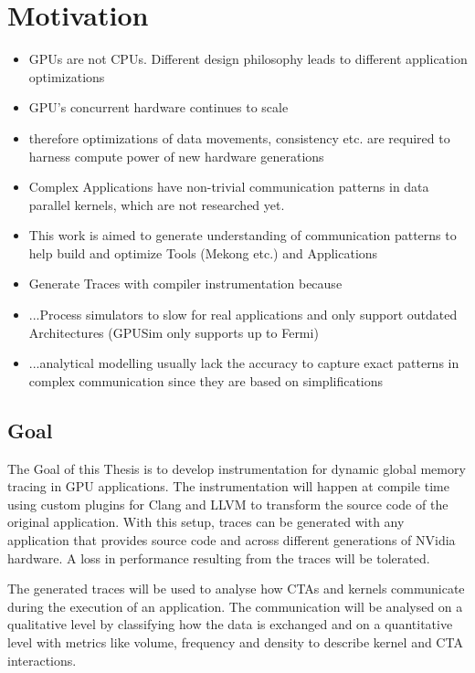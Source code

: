 \chapter{Motivation}
\begin{itemize}
	\item GPUs are not CPUs. Different design philosophy leads to different application optimizations
	\item GPU's concurrent hardware continues to scale
	\item therefore optimizations of data movements, consistency etc. are required to harness compute power of new hardware generations
	\item Complex Applications have non-trivial communication patterns in data parallel kernels, which are not researched yet.
	\item This work is aimed to generate understanding of communication patterns to help build and optimize Tools (Mekong etc.) and Applications
	\item Generate Traces with compiler instrumentation because
	\item ...Process simulators to slow for real applications and only support outdated Architectures (GPUSim only supports up to Fermi)
	\item ...analytical modelling usually lack the accuracy to capture exact patterns in complex communication since they are based on simplifications
	
\end{itemize}
\section{Goal}
The Goal of this Thesis is to develop instrumentation for dynamic global memory tracing in GPU applications. The instrumentation will happen at compile time using custom plugins for Clang and LLVM to transform the source code of the
original application. With this setup, traces can be generated with any application that provides source code and
across different generations of NVidia hardware. A loss in performance resulting from the traces will be tolerated.

The generated traces will be used to analyse how CTAs and kernels communicate during the execution of an application. 
The communication will be analysed on a qualitative level by classifying how the data is exchanged and on a quantitative level with metrics like volume, frequency and density to describe kernel and CTA interactions.

